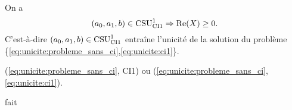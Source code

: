     \begin{prop}
      \label{prop:csu:ci1-1}
      On a 
      \begin{equation*}
        (a_0,a_1,b) \in \CSU[1]{CI1} \Rightarrow \Re(X)\ge 0. 
      \end{equation*}
      C'est-à-dire \((a_0,a_1,b) \in \CSU[1]{CI1}\) entraîne l'unicité de la solution du problème \{\eqref{eq:unicite:probleme_sans_ci},\eqref{eq:unicite:ci1}\}.
    \end{prop}
    \begin{REM}
      (\eqref{eq:unicite:probleme_sans_ci}, CI1) ou (\eqref{eq:unicite:probleme_sans_ci},\eqref{eq:unicite:ci1}).
    \end{REM}
    \begin{REP}
    fait
    \end{REP}
